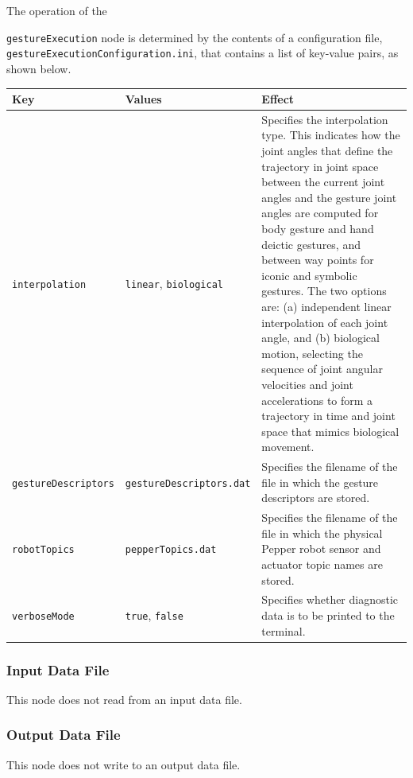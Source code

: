 \documentclass{CSSRforAfrica}
\begin{document}
{The operation of the {{\small \verb+gestureExecution+} node is determined by the contents of a configuration file,\\ {\small \verb+gestureExecutionConfiguration.ini+}, that contains a list of key-value pairs, as shown below.

\begin{center}
\begin{tabularx}{\linewidth}{| l | l | X|}
\hline 
{\small Key }                               & {\small Values }                                                 &  {\small Effect}       \\
\hline
{\footnotesize \verb+interpolation+ }  & {\footnotesize \verb+linear+, \verb+biological+}     & {\small Specifies the interpolation type. This indicates how the joint angles that define the trajectory in joint space between the current joint angles and the gesture joint angles are computed for body gesture and hand deictic gestures, and between way points for iconic and symbolic gestures. The two options are: (a) independent linear  interpolation of each joint angle, and (b)  biological motion, selecting  the sequence of  joint angular velocities and joint accelerations  to form a trajectory in time and joint space that mimics biological movement.}\\ 
\hline
{\footnotesize \verb+gestureDescriptors+ }  & {\footnotesize \verb+gestureDescriptors.dat+}     & {\small Specifies the  filename of the file in which the gesture descriptors are stored.} \\ 
\hline
{\footnotesize \verb+robotTopics+ }  & {\footnotesize \verb+pepperTopics.dat+}     & {\small Specifies the filename of the file in which the physical Pepper robot sensor and actuator topic names are stored.} \\
\hline
{\footnotesize \verb+verboseMode+}  & {\footnotesize \verb+true+, \verb+false+}     & {\small Specifies whether diagnostic data is to be printed to the terminal.} \\
\hline
\end{tabularx}
\end{center}


\subsubsection*{Input Data File}
This node does not read from an input data file.


\subsubsection*{Output Data File}
This node does not write to an output data file.

}}
\end{document}

